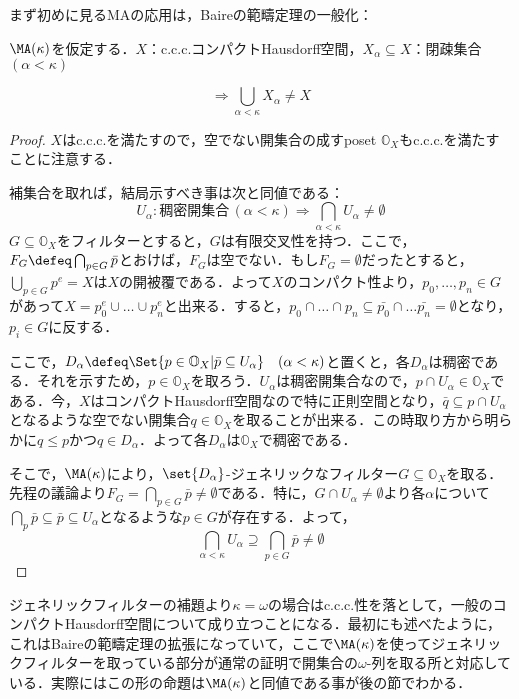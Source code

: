 \documentclass[a4j]{bxjsarticle}
\theoremstyle{definition}
\begin{document}
まず初めに見るMAの応用は，Baireの範疇定理の一般化：
\begin{lemma}
 $\MA(\kappa)$を仮定する．$X$：c.c.c.コンパクトHausdorff空間，$X_\alpha \subseteq X$：閉疎集合$(\alpha < \kappa)$

  \[
    \Longrightarrow \bigcup_{\alpha < \kappa} X_\alpha \neq X 
  \]
\end{lemma}
\begin{proof}
 $X$はc.c.c.を満たすので，空でない開集合の成すposet $\mathbb{O}_X$もc.c.c.を満たすことに注意する．

 補集合を取れば，結局示すべき事は次と同値である：
 \[
  U_\alpha : \text{稠密開集合}\, (\alpha < \kappa) \Rightarrow \bigcap_{\alpha < \kappa} U_\alpha \neq \emptyset
 \]
 $G \subseteq \mathbb{O}_X$をフィルターとすると，$G$は有限交叉性を持つ．ここで，$F_G \defeq \bigcap_{p \in G} \bar{p}$とおけば，$F_G$は空でない．もし$F_G = \emptyset$だったとすると，$\bigcup_{p \in G} p^e = X$は$X$の開被覆である．よって$X$のコンパクト性より，$p_0, \dots, p_n \in G$があって$X = p_0^e \cup \dots \cup p_n^e$と出来る．すると，$p_0 \cap \dots \cap p_n \subseteq \bar{p_0} \cap \dots \bar{p_n} = \emptyset$となり，$p_i \in G$に反する．

 ここで，$D_\alpha \defeq \Set{ p \in \mathbb{O}_X | \bar{p} \subseteq U_\alpha } \quad (\alpha < \kappa)$と置くと，各$D_\alpha$は稠密である．それを示すため，$p \in \mathbb{O}_X$を取ろう．$U_\alpha$は稠密開集合なので，$p \cap U_\alpha \in \mathbb{O}_X$である．今，$X$はコンパクトHausdorff空間なので特に正則空間となり，$\bar{q} \subseteq p \cap U_\alpha$となるような空でない開集合$q \in \mathbb{O}_X$を取ることが出来る．この時取り方から明らかに$q \leq p$かつ$q \in D_\alpha$．よって各$D_\alpha$は$\mathbb{O}_X$で稠密である．

 そこで，$\MA(\kappa)$により，$\set{D_\alpha}$-ジェネリックなフィルター$G \subseteq \mathbb{O}_X$を取る．先程の議論より$F_G = \bigcap_{p \in G} \bar{p} \neq \emptyset$である．特に，$G \cap U_\alpha \neq \emptyset$より各$\alpha$について$\bigcap_p \bar{p} \subseteq \bar{p} \subseteq U_\alpha$となるような$p \in G$が存在する．よって，
 \[
  \bigcap_{\alpha < \kappa} U_\alpha \supseteq \bigcap_{p \in G} \bar{p} \neq \emptyset
 \]
 \mbox{}
\end{proof}

ジェネリックフィルターの補題より$\kappa = \omega$の場合はc.c.c.性を落として，一般のコンパクトHausdorff空間について成り立つことになる．最初にも述べたように，これはBaireの範疇定理の拡張になっていて，ここで$\MA(\kappa)$を使ってジェネリックフィルターを取っている部分が通常の証明で開集合の$\omega$-列を取る所と対応している．実際にはこの形の命題は$\MA(\kappa)$と同値である事が後の節でわかる．
\end{document}
